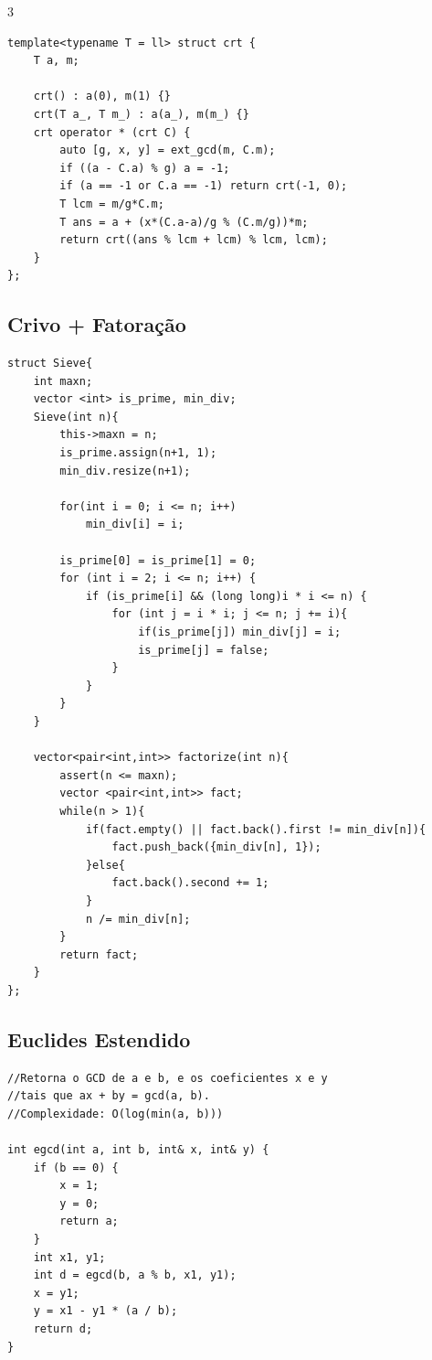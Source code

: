 \documentclass[9pt, a4paper, notitlepage]{extreport}
\begin{document}
\begin{multicols}{3}
\begin{verbatim}
template<typename T = ll> struct crt {
	T a, m;

	crt() : a(0), m(1) {}
	crt(T a_, T m_) : a(a_), m(m_) {}
	crt operator * (crt C) {
		auto [g, x, y] = ext_gcd(m, C.m);
		if ((a - C.a) % g) a = -1;
		if (a == -1 or C.a == -1) return crt(-1, 0);
		T lcm = m/g*C.m;
		T ans = a + (x*(C.a-a)/g % (C.m/g))*m;
		return crt((ans % lcm + lcm) % lcm, lcm);
	}
};
\end{verbatim}

\subsection{Crivo + Fatoração}
\begin{verbatim}
struct Sieve{
    int maxn;
    vector <int> is_prime, min_div;
    Sieve(int n){
        this->maxn = n;
        is_prime.assign(n+1, 1);
        min_div.resize(n+1);

        for(int i = 0; i <= n; i++)
            min_div[i] = i;

        is_prime[0] = is_prime[1] = 0;
        for (int i = 2; i <= n; i++) {
            if (is_prime[i] && (long long)i * i <= n) {
                for (int j = i * i; j <= n; j += i){
                    if(is_prime[j]) min_div[j] = i;
                    is_prime[j] = false;
                }
            }
        }
    }

    vector<pair<int,int>> factorize(int n){
        assert(n <= maxn);
        vector <pair<int,int>> fact;
        while(n > 1){
            if(fact.empty() || fact.back().first != min_div[n]){
                fact.push_back({min_div[n], 1});
            }else{
                fact.back().second += 1;
            }
            n /= min_div[n];
        }
        return fact;
    }
};
\end{verbatim}

\subsection{Euclides Estendido}
\begin{verbatim}
//Retorna o GCD de a e b, e os coeficientes x e y
//tais que ax + by = gcd(a, b).
//Complexidade: O(log(min(a, b)))

int egcd(int a, int b, int& x, int& y) {
    if (b == 0) {
        x = 1;
        y = 0;
        return a;
    }
    int x1, y1;
    int d = egcd(b, a % b, x1, y1);
    x = y1;
    y = x1 - y1 * (a / b);
    return d;
}
\end{verbatim}


\end{multicols}
\end{document}

